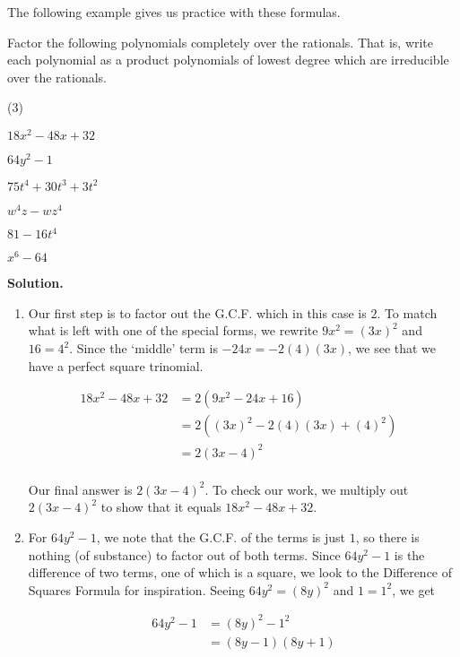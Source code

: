 The following example gives us practice with these formulas.

\begin{ex}\label{FormulaFactoring}  Factor the following polynomials completely over the rationals.  That is, write each polynomial as a product polynomials of lowest degree which are irreducible over the rationals. 

\begin{tasks}(3)

\task  $18x^2 - 48x + 32$  

\task  $64y^2 - 1$ 

\task  $75t^4 + 30t^3 + 3t^2$

\task  $w^4 z - w z^4$

\task  \label{quadinform1} $81 - 16t^4$ 

\task  \label{quadinform2} $x^6 - 64$

\end{tasks}

{\bf Solution.}

\begin{enumerate}
\item  Our first step is to factor out the G.C.F. which in this case is $2$.  To match what is left with one of the special forms, we rewrite $9x^2 = (3x)^2$ and $16 = 4^2$. Since the `middle' term is $-24x = -2(4)(3x)$, we see that we have a perfect square trinomial.

\begin{align*}
18x^2 - 48x + 32 & = 2(9x^2 - 24x + 16) \tag{Factor out G.C.F.}\\
& = 2((3x)^2 - 2(4)(3x) + (4)^2) & \\
& = 2(3x-4)^2 \tag{Perfect Square Trinomial:  $a = 3x$, $b=4$} \\
\end{align*}

Our final answer is $2(3x-4)^2$.  To check our work, we multiply out $2(3x-4)^2$ to show that it equals $18x^2 - 48x + 32$.
 
\item  For $64y^2 - 1$, we note that the G.C.F. of the terms is just $1$, so there is nothing (of substance) to factor out of both terms. Since $64y^2 - 1$ is the difference of two terms, one of which is a square, we look to the Difference of Squares Formula for inspiration.   Seeing $64y^2 = (8y)^2$ and $1 = 1^2$, we get

\begin{align*}
64y^2 - 1 & = (8y)^2 - 1^2 \\
& = (8y-1)(8y+1) \tag{Difference of Squares, $a = 8y$, $b = 1$}
\end{align*}


\end{enumerate}
\end{ex}
